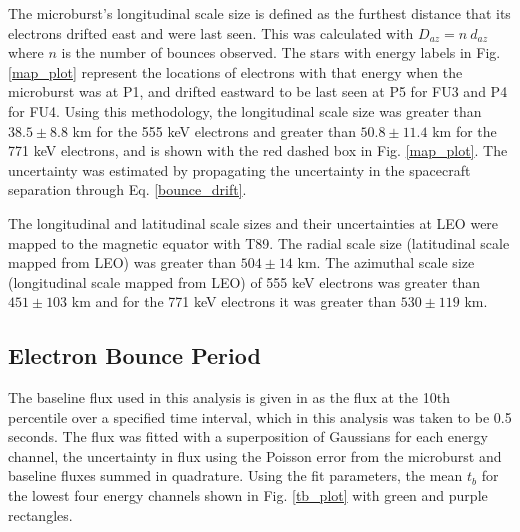 \documentclass[draft, linenumbers]{agujournal}
\begin{document}
The microburst's longitudinal scale size is defined as the furthest distance that its electrons drifted east and were last seen. This was calculated with $D_{az} = n \ d_{az}$ where $n$ is the number of bounces observed. The stars with energy labels in Fig. \ref{map_plot} represent the locations of electrons with that energy when the microburst was  at P1, and drifted eastward to be last seen at P5 for FU3 and P4 for FU4. Using this methodology, the  longitudinal scale size was  greater than $ 38.5 \pm 8.8$ km for the 555 keV electrons and greater than $ 50.8 \pm 11.4$ km for the 771 keV electrons, and is shown with the red dashed box in Fig. \ref{map_plot}. The uncertainty was estimated by propagating the uncertainty in the spacecraft separation through Eq. \ref{bounce_drift}.

The  longitudinal and latitudinal scale sizes and their uncertainties at LEO were mapped to the magnetic equator with T89. The radial scale size (latitudinal scale mapped from LEO) was greater than $504 \pm​ 14$ km. The azimuthal scale size (longitudinal scale mapped from LEO) of 555 keV electrons was greater than $451 \pm 103$ km and for the 771 keV electrons it was greater than $530 \pm 119$ km.

\subsection{Electron Bounce Period} \label{t_b} %

 The baseline flux used in this analysis is given in \citet{O'Brien2004} as the flux at the 10th percentile over a specified time interval, which in this analysis was taken to be 0.5 seconds. The flux was fitted with a superposition of Gaussians for each energy channel,  the uncertainty in flux  using the Poisson error from the microburst and baseline fluxes summed in quadrature. Using the fit parameters, the mean $t_b$ for the lowest four energy channels  shown in Fig. \ref{tb_plot} with green and purple rectangles.  
\end{document}
